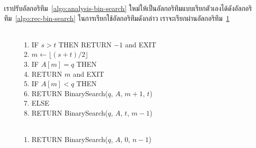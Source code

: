 เรา{\wbr}ปรับ{\wbr}อัล{\wbr}กอ{\wbr}ริ{\wbr}ทึม~\ref{algo:analysis-bin-search}
ใหม่{\wbr}ให้{\wbr}เป็น{\wbr}อัล{\wbr}กอ{\wbr}ริ{\wbr}ทึม{\wbr}แบบ{\wbr}เรียก{\wbr}ตัวเอง{\wbr}ได้{\wbr}ดัง{\wbr}อัล{\wbr}กอ{\wbr}ริ{\wbr}ทึม~\ref{algo:rec-bin-search}
ใน{\wbr}การ{\wbr}เรียก{\wbr}ใช้{\wbr}อัล{\wbr}กอ{\wbr}ริ{\wbr}ทึม{\wbr}ดังกล่าว{\wbr}
เรา{\wbr}จะ{\wbr}เรียก{\wbr}ผ่าน{\wbr}อัล{\wbr}กอ{\wbr}ริ{\wbr}ทึม~\ref{algo:rec-bin-search-main}

\begin{figure}
\begin{algt}
\label{algo:rec-bin-search}
\\
1.\settowidth{\algbackindent}{1.}\hspace*{-\algbackindent}\hspace*{0.2in} IF $s > t$ THEN RETURN $-1$ and EXIT\\
2.\settowidth{\algbackindent}{2.}\hspace*{-\algbackindent}\hspace*{0.2in} $m\leftarrow \lfloor (s+t)/2\rfloor$\\
3.\settowidth{\algbackindent}{3.}\hspace*{-\algbackindent}\hspace*{0.2in} IF $A[m] = q$ THEN\\
4.\settowidth{\algbackindent}{4.}\hspace*{-\algbackindent}\hspace*{0.2in}\hspace*{0.2in} RETURN $m$ and EXIT\\
5.\settowidth{\algbackindent}{5.}\hspace*{-\algbackindent}\hspace*{0.2in} IF $A[m] < q$ THEN\\
6.\settowidth{\algbackindent}{6.}\hspace*{-\algbackindent}\hspace*{0.2in}\hspace*{0.2in} RETURN BinarySearch($q$, $A$, $m+1$, $t$)\\
7.\settowidth{\algbackindent}{7.}\hspace*{-\algbackindent}\hspace*{0.2in} ELSE\\
8.\settowidth{\algbackindent}{8.}\hspace*{-\algbackindent}\hspace*{0.2in}\hspace*{0.2in} RETURN BinarySearch($q$, $A$, $t$, $m-1$)
\end{algt}

\begin{algt}
\label{algo:rec-bin-search-main}
\\
1.\settowidth{\algbackindent}{1.}\hspace*{-\algbackindent}\hspace*{0.2in} RETURN BinarySearch($q$, $A$, $0$, $n-1$)
\end{algt}
\end{figure}

